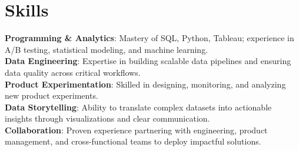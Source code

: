 \section{Skills}
  \begin{itemize}[leftmargin=0.1in, label={}]
    \normalsize{\item{
      \textbf{Programming & Analytics}: Mastery of SQL, Python, Tableau; experience in A/B testing, statistical modeling, and machine learning. \\
      \textbf{Data Engineering}: Expertise in building scalable data pipelines and ensuring data quality across critical workflows. \\
      \textbf{Product Experimentation}: Skilled in designing, monitoring, and analyzing new product experiments. \\
      \textbf{Data Storytelling}: Ability to translate complex datasets into actionable insights through visualizations and clear communication. \\
      \textbf{Collaboration}: Proven experience partnering with engineering, product management, and cross-functional teams to deploy impactful solutions. \\
     }}
  \end{itemize}
